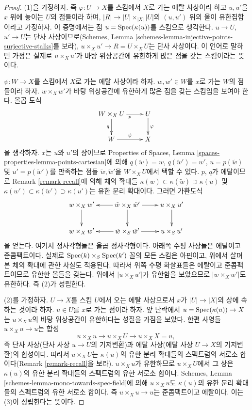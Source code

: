 \begin{proof}
(1)을 가정하자. 즉 $\varphi : U \to X$를 스킴에서 $X$로 가는 에탈 사상이라
하고 $u, u'$을 $x$ 위에 놓이는 $U$의 점들이라 하며,
$|R| \to |U| \times_{|X|} |U|$의 $(u, u')$ 위의 올이 유한집합이라고
가정하자. 이 증명에서는 점 $u = \mathop{\mathrm{Spec}}(\kappa(u))$를 스킴으로 생각한다.
$u \to U$, $u' \to U$는 단사 사상이므로(Schemes, Lemma
\ref{schemes-lemma-injective-points-surjective-stalks}를 보라),
$u \times_X u' \to R = U \times_X U$는 단사 사상이다. 이 언어로 말하면
가정은 실제로 $u \times_X u'$가 바탕 위상공간에 유한하게 많은 점을
갖는 스킴이라는 뜻이다.

$\psi : W \to X$를 스킴에서 $X$로 가는 에탈 사상이라 하자.
$w, w' \in W$를 $x$로 가는 $W$의 점들이라 하자. $w \times_X w'$가
바탕 위상공간에 유한하게 많은 점을 갖는 스킴임을 보여야 한다.
올곱 도식
$$
\xymatrix{
W \times_X U \ar[r]_p \ar[d]_q & U \ar[d]^\varphi \\
W \ar[r]^\psi & X
}
$$
을 생각하자. $x$는 $u$와 $u'$의 상이므로 Properties of Spaces, Lemma
\ref{spaces-properties-lemma-points-cartesian}에 의해
$q(\tilde w) = w$, $q(\tilde w') = w'$, $u = p(\tilde w)$ 및
$u' = p(\tilde w')$를 만족하는 점들 $\tilde w, \tilde w'$을
$W \times_X U$에서 택할 수 있다. $p$, $q$가 에탈이므로 Remark
\ref{remark-recall}에 의해 체의 확대들
$\kappa(w) \subset \kappa(\tilde w) \supset \kappa(u)$ 및
$\kappa(w') \subset \kappa(\tilde w') \supset \kappa(u')$는 유한 분리
확대이다. 그러면 가환도식
$$
\xymatrix{
w \times_X w' \ar[d] &
\tilde w \times_X \tilde w' \ar[l] \ar[d] \ar[r] &
u \times_X u' \ar[d] \\
w \times_X w' &
\tilde w \times_S \tilde w' \ar[l] \ar[r] &
u \times_S u'
}
$$
을 얻는다. 여기서 정사각형들은 올곱 정사각형이다. 아래쪽 수평 사상들은
에탈이고 준콤팩트이다. 실제로 $\mathop{\mathrm{Spec}}(k) \times_S \mathop{\mathrm{Spec}}(k')$ 꼴의 모든
스킴은 아핀이고, 위에서 살펴본 체의 확대에 관한 사실도 적용된다.
따라서 위쪽 수평 화살표들은 에탈이고 준콤팩트이므로 유한한 올들을 갖는다.
위에서 $|u \times_X u'|$가 유한함을 보았으므로 $|w \times_X w'|$도
유한하다. 즉 (2)가 성립한다.

\medskip\noindent
(2)를 가정하자. $U \to X$를 스킴 $U$에서 오는 에탈 사상으로서 $x$가
$|U| \to |X|$의 상에 속하는 것이라 하자. $u \in U$를 $x$로 가는
점이라 하자. 앞 단락에서 $u = \mathop{\mathrm{Spec}}(\kappa(u)) \to X$는
$u \times_X u$의 바탕 위상공간이 유한하다는 성질을 가짐을 보았다.
한편 사영들 $u \times_X u \to u$는 합성
$$
u \times_X u \longrightarrow
u \times_X U \longrightarrow
u \times_X X = u,
$$
즉 단사 사상(단사 사상 $u \to U$의 기저변환)과 에탈 사상(에탈 사상
$U \to X$의 기저변환)의 합성이다. 따라서 $u \times_X U$는
$\kappa(u)$의 유한 분리 확대들의 스펙트럼의 서로소 합이다(Remark
\ref{remark-recall}을 보라). $u \times_X u$가 유한하므로
$u \times_X U$에서 그 상은 $\kappa(u)$의 유한 분리 확대들의 스펙트럼의
유한 서로소 합이다. Schemes, Lemma
\ref{schemes-lemma-mono-towards-spec-field}에 의해 $u \times_X u$도
$\kappa(u)$의 유한 분리 확대들의 스펙트럼의 유한 서로소 합이다.
즉 $u \times_X u \to u$는 준콤팩트이고 에탈이다. 이는 (3)이 성립한다는
뜻이다.


\end{proof}
